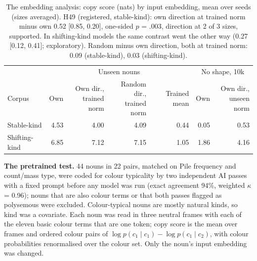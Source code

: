 \begin{table}[!htbp]
\centering\small

\begin{tabular}{@{}lrrrrrr@{}}
\toprule
 & \multicolumn{4}{c}{Unseen nouns} & \multicolumn{2}{c}{No shape, 10k} \\ \cmidrule(lr){2-5}\cmidrule(lr){6-7}
Corpus & Own & \shortstack{Own dir.,\\trained norm} & \shortstack{Random dir.,\\trained norm} & Trained mean & Own & \shortstack{Own dir.,\\unseen norm} \\
\midrule
Stable-kind & 4.53 & 4.00 & 4.09 & \textminus{}0.44 & \textminus{}0.05 & 0.53 \\
Shifting-kind & 6.85 & 7.12 & 7.15 & 1.05 & 1.86 & 4.16 \\
\bottomrule
\end{tabular}
\caption{The embedding analysis: copy score (nats) by input embedding, mean over seeds (sizes averaged). H49 (registered, stable-kind): own direction at trained norm minus own \textminus{}0.52 [\textminus{}0.85, \textminus{}0.20], one-sided $p$ = .003, direction at 2 of 3 sizes, supported. In shifting-kind models the same contrast went the other way (0.27 [0.12, 0.41]; exploratory). Random minus own direction, both at trained norm: 0.09 (stable-kind), 0.03 (shifting-kind).}
\label{tab:N5}
\end{table}

\textbf{The pretrained test.} 44 nouns in 22 pairs, matched on Pile frequency and count/mass type, were coded for colour typicality by two independent AI passes with a fixed prompt before any model was run (exact agreement 94\%, weighted $\kappa$ = 0.96); nouns that are also colour terms or that both passes flagged as polysemous were excluded. Colour-typical nouns are mostly natural kinds, so kind was a covariate. Each noun was read in three neutral frames with each of the eleven basic colour terms that are one token; copy score is the mean over frames and ordered colour pairs of $\log p(c_1 \mid c_1) - \log p(c_1 \mid c_2)$, with colour probabilities renormalised over the colour set. Only the noun's input embedding was changed.


